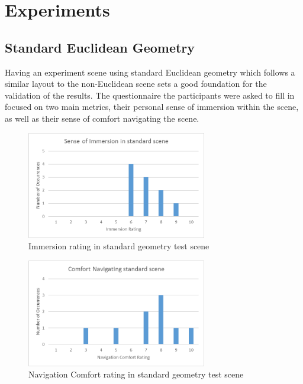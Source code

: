 	\section{Experiments}
	\label{exp:exp}

		\subsection{Standard Euclidean Geometry}
		\label{exp:exp:standard}

			Having an experiment scene using standard Euclidean geometry which follows a similar layout to the non-Euclidean scene sets a good foundation for the validation of the results. %
			The questionnaire the participants were asked to fill in focused on two main metrics, their personal sense of immersion within the scene, as well as their sense of comfort navigating the scene.



			\begin{figure}[H]
				\includegraphics[width=0.7\textwidth]{Images/Standard_Immersion}
				\centering
				\caption{Immersion rating in standard geometry test scene}
				\label{exp:fig:standard_immersion}
			\end{figure}

			\begin{figure}[H]
				\includegraphics[width=0.7\textwidth]{Images/Standard_Comfort}
				\centering
				\caption{Navigation Comfort rating in standard geometry test scene}
				\label{exp:fig:standard_comfort}
			\end{figure}

